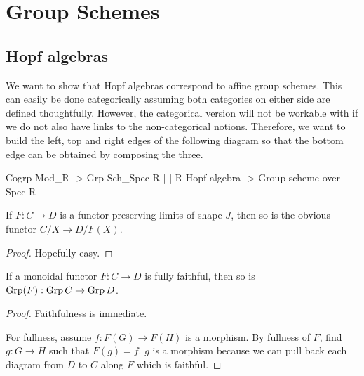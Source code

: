 \section{Group Schemes}


\subsection{Hopf algebras}


We want to show that Hopf algebras correspond to affine group schemes. This can easily be done
categorically assuming both categories on either side are defined thoughtfully. However, the
categorical version will not be workable with if we do not also have links to the non-categorical
notions. Therefore, we want to build the left, top and right edges of the following diagram so that
the bottom edge can be obtained by composing the three.

   Cogrp Mod_R ->     Grp Sch_{Spec R}
        |                    |
R-Hopf algebra -> Group scheme over Spec R


\begin{proposition}
  \label{0-over-lim}
  \uses{}
  \leanok

  If $F : C \to D$ is a functor preserving limits of shape $J$, then so is the obvious functor $C / X \to D / F(X)$.
\end{proposition}
\begin{proof}
  \uses{}

  Hopefully easy.
\end{proof}


\begin{proposition}
  \label{0-full-faithful-grp}
  \uses{}
  \leanok

  If a monoidal functor $F : C \to D$ is fully faithful, then so is $\operatorname{Grp}(F) : \operatorname{Grp} C \to \operatorname{Grp} D$.
\end{proposition}
\begin{proof}
  \uses{}
  \leanok

  Faithfulness is immediate.

  For fullness, assume $f : F(G) \to F(H)$ is a morphism. By fullness of $F$, find $g : G \to H$ such that $F(g) = f$. $g$ is a morphism because we can pull back each diagram from $D$ to $C$ along $F$ which is faithful.
\end{proof}


